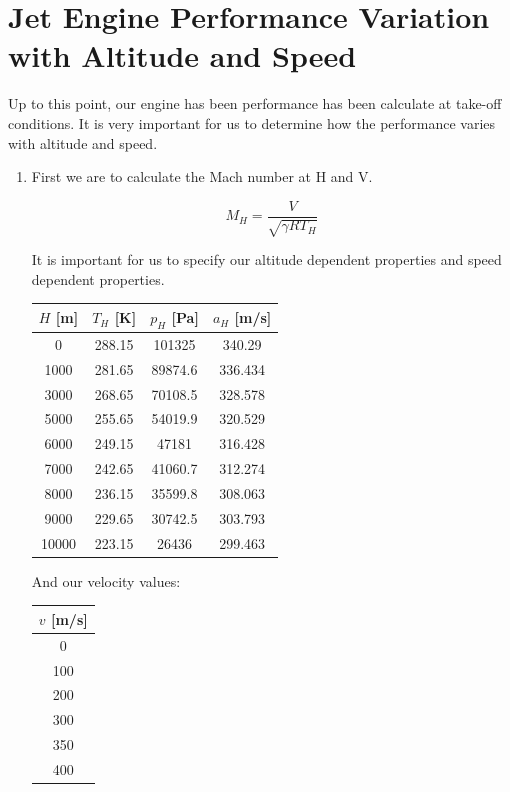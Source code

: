 \documentclass[titlepage]{article}
\begin{document}
\section{Jet Engine Performance Variation with Altitude and Speed}

Up to this point, our engine has been performance has been calculate at take-off conditions. It is very important for us to determine how the 
performance varies with altitude and speed. 

\begin{enumerate}
  \item First we are to calculate the Mach number at H and V.
  
  \begin{equation}
    M_{H} = \frac{V}{\sqrt{\gamma R T_{H}}}
  \end{equation}

  It is important for us to specify our altitude dependent properties and speed dependent properties.

  \begin{center}
    \begin{tabular}{|c|c|c|c|}
      \hline
      $H$ [m] & $T_{H}$ [K] & $p_{H}$ [Pa] & $a_{H}$ [m/s] \\
      \hline
      0 & 288.15 & 101325 & 340.29 \\
      \hline
      1000 & 281.65 & 89874.6	& 336.434 \\
      \hline
      3000	& 268.65	& 70108.5	& 328.578 \\
      \hline
      5000	& 255.65	& 54019.9	& 320.529 \\
      \hline
      6000	& 249.15	& 47181 &	316.428 \\
      \hline
      7000 &	242.65	& 41060.7	& 312.274 \\
      \hline
      8000	& 236.15	& 35599.8	& 308.063 \\
      \hline
      9000	& 229.65	& 30742.5 &	303.793 \\
      \hline
      10000	& 223.15	& 26436	& 299.463 \\
      \hline
    \end{tabular}
  \end{center}

  And our velocity values:

  \begin{center}
    \begin{tabular}{|c|}
      \hline
      $v$ [m/s] \\
      \hline
      0 \\
      \hline
      100 \\
      \hline
      200 \\
      \hline
      300 \\
      \hline
      350 \\
      \hline
      400 \\
      \hline
    \end{tabular}
  \end{center}


\end{enumerate}
\end{document}
